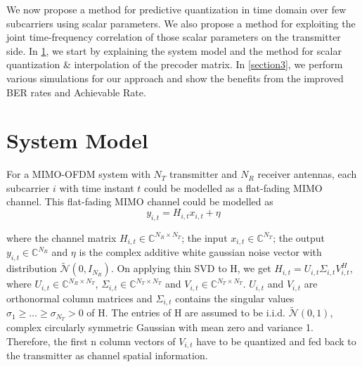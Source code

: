 \documentclass[conference]{IEEEtran}
\begin{document}
We now propose a method for predictive quantization in time domain over few subcarriers using scalar parameters. We also propose a method for exploiting the joint time-frequency correlation of those scalar parameters on the transmitter side. In \ref{section2}, we start by explaining the system model and the method for scalar quantization \& interpolation of the precoder matrix. In \ref{section3}, we perform various simulations for our approach and show the benefits from the improved BER rates and Achievable Rate. 

\section{System Model}
\label{section2}
For a MIMO-OFDM system with $N_T$ transmitter and $N_R$ receiver antennas, each subcarrier $i$ with time instant $t$ could be modelled as a flat-fading MIMO channel. This flat-fading MIMO channel could be modelled as 
\vspace{-1pt}
\begin{equation}
y_{i,t} = H_{i,t} x_{i,t}+ \eta
\end{equation}

\vspace{-1pt}
where the channel matrix $H_{i,t} \in \mathbb{C}^{N_R \times N_T}$; the input $x_{i,t} \in \mathbb{C}^{N_T}$; the output $y_{i,t} \in \mathbb{C}^{N_R}$ and $\eta$ is the complex additive white gaussian noise vector with distribution $\tilde{\mathcal{N}}(0,I_{N_R})$. On applying thin SVD to H, we get $H_{i,t} = U_{i,t} \Sigma_{i,t} V_{i,t}^{H}$, where $U_{i,t} \in \mathbb{C}^{N_R \times N_T}$, $\Sigma_{i,t} \in \mathbb{C}^{N_T \times N_T}$  and $V_{i,t} \in \mathbb{C}^{N_T \times N_T}$. $U_{i,t}$ and $V_{i,t}$ are orthonormal column matrices and $\Sigma_{i,t}$ contains the singular values $\sigma_1 \geq \ldots \geq \sigma_{N_T} > 0$ of H. The entries of H are assumed to be i.i.d. $\tilde{\mathcal{N}}(0,1)$, complex circularly symmetric Gaussian with mean zero and variance 1. Therefore, the first n column vectors of $V_{i,t}$ have to be quantized and fed back to the transmitter as channel spatial information.
\end{document}
